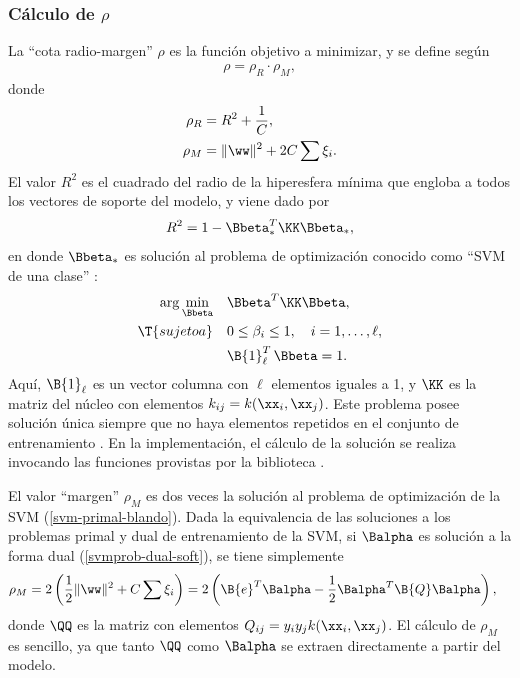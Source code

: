 %
\subsubsection{Cálculo de $\rho$}
%
La ``cota radio-margen'' $\rho$ es la función objetivo a minimizar, y
se define según
%
\begin{align}
  \rho = \rho_R \cdot \rho_M,
\end{align}
%
donde
%
\begin{align}
  \label{rho-r}
  \rho_R &= R^2+\frac{1}{C}, \\
  \label{rho-m}
  \rho_M &= \|\ww\|^2+2C\sum\xi_i.
\end{align}
%
El valor $R^2$ es el cuadrado del radio de la hiperesfera mínima que
engloba a todos los vectores de soporte del modelo, y viene dado por
%
\begin{align}
  R^2 = 1 - \Bbeta_*^T \KK \Bbeta_*,
\end{align}
%
en donde $\Bbeta_*$ es solución al problema de optimización conocido
como ``SVM de una clase'' \cite{scholkopf}:
%
\begin{align}
\begin{split}
  \arg\min_{\Bbeta}\quad&\Bbeta^T \KK \Bbeta,\\
  \T{sujeto a}    \quad&0\leq\beta_i\leq{}1,\quad{}i=1,\ldots,\ell,\\
                       &\B{1}^T_\ell\,\Bbeta=1.
  \end{split}
  \label{svm-oneclass}
\end{align}
%
Aquí, $\B{1}_{\ell}$ es un vector columna con $\ell$ elementos iguales
a 1, y $\KK$ es la matriz del núcleo con elementos
$k_{ij}=k(\xx_i,\xx_j)$.
Este problema posee solución única siempre que no haya elementos
repetidos en el conjunto de entrenamiento \cite{chung}.
En la implementación, el cálculo de la solución se realiza invocando
las funciones provistas por la biblioteca  \cite{libsvm}.

El valor ``margen'' $\rho_M$ es dos veces la solución al problema de
optimización de la SVM (\ref{svm-primal-blando}).
Dada la equivalencia de las soluciones a los problemas primal y dual
de entrenamiento de la SVM, si $\Balpha$ es solución a la forma dual
(\ref{svmprob-dual-soft}), se tiene simplemente
%
\begin{align}
\label{prieqdual}
  \rho_M &= 2\left(\frac{1}{2}\|\ww\|^2+C\sum\xi_i \right)
  =2\left(\B{e}^T\Balpha-\frac{1}{2}\Balpha^T\B{Q}\Balpha\right),
\end{align}
%
donde $\QQ$ es la matriz con elementos $Q_{ij}=y_iy_jk(\xx_i,\xx_j)$.
El cálculo de $\rho_M$ es sencillo, ya que tanto $\QQ$ como $\Balpha$
se extraen directamente a partir del modelo.
